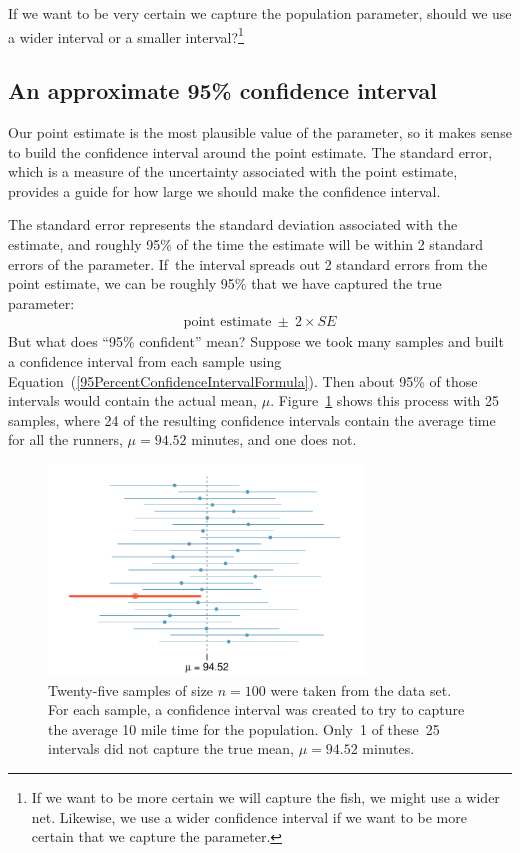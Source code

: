 \begin{exercise}
If we want to be very certain we capture the population parameter, should we use a wider interval or a smaller interval?\footnote{If we want to be more certain we will capture the fish, we might use a wider net. Likewise, we use a wider confidence interval if we want to be more certain that we capture the parameter.}
\end{exercise}

\subsection{An approximate 95\% confidence interval}

Our point estimate is the most plausible value of the parameter, so it makes sense to build the confidence interval around the point estimate. The standard error, which is a measure of the uncertainty associated with the point estimate, provides a guide for how large we should make the confidence interval.

The standard error represents the standard deviation associated with the estimate, and roughly 95\% of the time the estimate will be within 2 standard errors of the parameter. If~the interval spreads out 2 standard errors from the point estimate, we can be roughly 95\%  that we have captured the true parameter:
\begin{eqnarray}
\text{point estimate}\ \pm\ 2\times SE
\label{95PercentConfidenceIntervalFormula}
\end{eqnarray}
But what does ``95\% confident'' mean? Suppose we took many samples and built a confidence interval from each sample using Equation~(\ref{95PercentConfidenceIntervalFormula}). Then about 95\% of those intervals would contain the actual mean, $\mu$. Figure~\ref{95PercentConfidenceInterval} shows this process with 25 samples, where 24 of the resulting confidence intervals contain the average time for all the runners, $\mu=94.52$ minutes, and one does not.

\begin{figure}[hht]
   \centering
   \includegraphics[width=0.75\textwidth]{04/figures/95PercentConfidenceInterval/95PercentConfidenceInterval}
   \caption{Twenty-five samples of size $n=100$ were taken from the  data set. For each sample, a confidence interval was created to try to capture the average 10 mile time for the population. Only~1 of these~25 intervals did not capture the true mean, $\mu = 94.52$ minutes.}
   \label{95PercentConfidenceInterval}
\end{figure}

